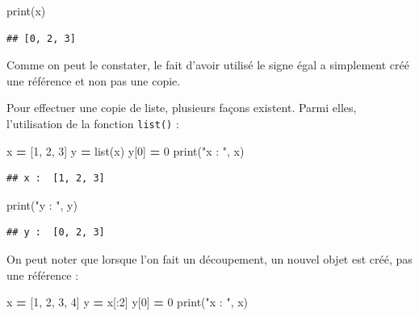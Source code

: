 \documentclass[12pt,]{book}
\newenvironment{Shaded}{\begin{snugshade}}{\end{snugshade}}
\newcommand{\DecValTok}[1]{\textcolor[rgb]{0.00,0.00,0.81}{#1}}
\newcommand{\StringTok}[1]{\textcolor[rgb]{0.31,0.60,0.02}{#1}}
\newcommand{\OperatorTok}[1]{\textcolor[rgb]{0.81,0.36,0.00}{\textbf{#1}}}
\newcommand{\BuiltInTok}[1]{#1}
\newcommand{\NormalTok}[1]{#1}
\numberwithin{equation}{section}
\numberwithin{countremarque}{section}
\begin{document}
\begin{Shaded}
\begin{Highlighting}[]
\BuiltInTok{print}\NormalTok{(x)}
\end{Highlighting}
\end{Shaded}

\begin{lstlisting}
## [0, 2, 3]
\end{lstlisting}

Comme on peut le constater, le fait d'avoir utilisé le signe égal a
simplement créé une référence et non pas une copie.

Pour effectuer une copie de liste, plusieurs façons existent. Parmi
elles, l'utilisation de la fonction \texttt{list()} :

\begin{Shaded}
\begin{Highlighting}[]
\NormalTok{x }\OperatorTok{=}\NormalTok{ [}\DecValTok{1}\NormalTok{, }\DecValTok{2}\NormalTok{, }\DecValTok{3}\NormalTok{]}
\NormalTok{y }\OperatorTok{=} \BuiltInTok{list}\NormalTok{(x)}
\NormalTok{y[}\DecValTok{0}\NormalTok{] }\OperatorTok{=} \DecValTok{0}
\BuiltInTok{print}\NormalTok{(}\StringTok{"x : "}\NormalTok{, x)}
\end{Highlighting}
\end{Shaded}

\begin{lstlisting}
## x :  [1, 2, 3]
\end{lstlisting}

\begin{Shaded}
\begin{Highlighting}[]
\BuiltInTok{print}\NormalTok{(}\StringTok{"y : "}\NormalTok{, y)}
\end{Highlighting}
\end{Shaded}

\begin{lstlisting}
## y :  [0, 2, 3]
\end{lstlisting}

On peut noter que lorsque l'on fait un découpement, un nouvel objet est
créé, pas une référence :

\begin{Shaded}
\begin{Highlighting}[]
\NormalTok{x }\OperatorTok{=}\NormalTok{ [}\DecValTok{1}\NormalTok{, }\DecValTok{2}\NormalTok{, }\DecValTok{3}\NormalTok{, }\DecValTok{4}\NormalTok{]}
\NormalTok{y }\OperatorTok{=}\NormalTok{ x[:}\DecValTok{2}\NormalTok{]}
\NormalTok{y[}\DecValTok{0}\NormalTok{] }\OperatorTok{=} \DecValTok{0}
\BuiltInTok{print}\NormalTok{(}\StringTok{"x : "}\NormalTok{, x)}
\end{Highlighting}
\end{Shaded}
\end{document}
